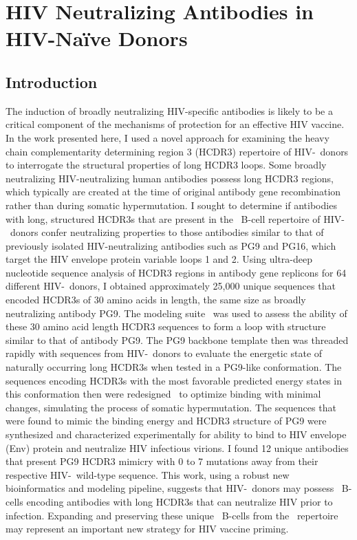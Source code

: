 \chapter{HIV Neutralizing Antibodies in HIV-Na\"{i}ve Donors}
\label{chap:chapter3}
\section{Introduction}
The induction of broadly neutralizing HIV-specific antibodies is likely to be a critical component of the mechanisms of protection for an effective HIV vaccine. In the work presented here, I used a novel approach for examining the heavy chain complementarity determining region 3 (HCDR3) repertoire of HIV-\naive~donors to interrogate the structural properties of long HCDR3 loops. Some broadly neutralizing HIV-neutralizing human antibodies possess long HCDR3 regions, which typically are created at the time of original antibody gene recombination rather than during somatic hypermutation. I sought to determine if antibodies with long, structured HCDR3s that are present in the \naive~B-cell repertoire of HIV-\naive~donors confer neutralizing properties to those antibodies similar to that of previously isolated HIV-neutralizing antibodies such as PG9 and PG16, which target the HIV envelope protein variable loops 1 and 2. Using ultra-deep nucleotide sequence analysis of HCDR3 regions in antibody gene replicons for 64 different HIV-\naive~donors, I obtained approximately 25,000 unique sequences that encoded HCDR3s of 30 amino acids in length, the same size as broadly neutralizing antibody PG9. The modeling suite \rosetta~was used to assess the ability of these 30 amino acid length HCDR3 sequences to form a loop with structure similar to that of antibody PG9. The PG9 backbone template then was threaded rapidly with sequences from HIV-\naive~donors to evaluate the energetic state of naturally occurring long HCDR3s when tested in a PG9-like conformation. The sequences encoding HCDR3s with the most favorable predicted energy states in this conformation then were redesigned \silico~to optimize binding with minimal changes, simulating the process of somatic hypermutation. The sequences that were found to mimic the binding energy and HCDR3 structure of PG9 were synthesized and characterized experimentally for ability to bind to HIV envelope (Env) protein and neutralize HIV infectious virions. I found 12 unique antibodies that present PG9 HCDR3 mimicry with 0 to 7 mutations away from their respective HIV-\naive~wild-type sequence. This work, using a robust new bioinformatics and modeling pipeline, suggests that HIV-\naive~donors may possess \naive~B-cells encoding antibodies with long HCDR3s that can neutralize HIV prior to infection. Expanding and preserving these unique \naive~B-cells from the \naive~repertoire may represent an important new strategy for HIV vaccine priming.

